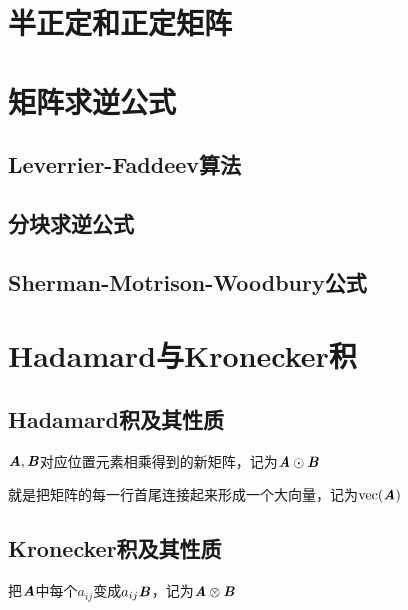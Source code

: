 \section{半正定和正定矩阵}
\label{sec:半正定和正定矩阵}

\section{矩阵求逆公式}
\label{sec:矩阵求逆公式}

\subsection{Leverrier-Faddeev算法}
\label{sub:Leverrier-Faddeev算法}

\subsection{分块求逆公式}
\label{sub:分块求逆公式}

\subsection{Sherman-Motrison-Woodbury公式}
\label{sub:Sherman-Motrison-Woodbury公式}

\section{Hadamard与Kronecker积}
\label{sec:Hadamard与Kronecker积}

\subsection{Hadamard积及其性质}
\label{sub:Hadamard积及其性质}

\begin{definition}[Hadamard积]
    $\boldsymbol{\mathit{A}}, \boldsymbol{\mathit{B}}$对应位置元素相乘得到的新矩阵，记为$\boldsymbol{\mathit{A}} \odot \boldsymbol{\mathit{B}}$
\end{definition}

\begin{definition}[矩阵的向量化]
    就是把矩阵的每一行首尾连接起来形成一个大向量，记为$\mathrm{vec}(\boldsymbol{\mathit{A}})$
\end{definition}
\subsection{Kronecker积及其性质}
\label{sub:Kronecker积及其性质}


\begin{definition}[Kronecker积]
    把$\boldsymbol{\mathit{A}}$中每个$a_{ij}$变成$a_{ij}\boldsymbol{\mathit{B}}$，记为$\boldsymbol{\mathit{A}} \otimes \boldsymbol{\mathit{B}}$
\end{definition}

\begin{definition}
\end{definition}

